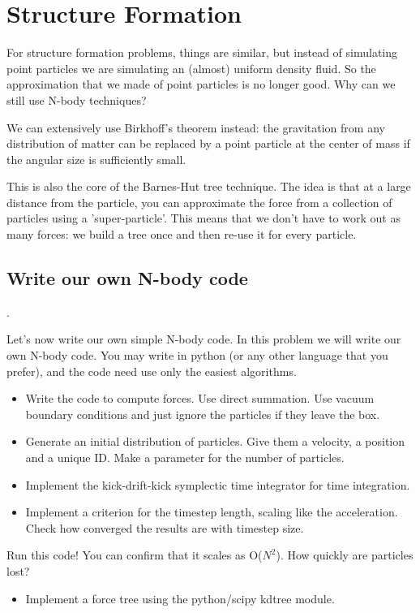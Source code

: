 \documentclass[12pt]{article}
\begin{document}
\section{Structure Formation}

For structure formation problems, things are similar, but instead of simulating point particles we are simulating an (almost) uniform density fluid. So the approximation that we made of point particles is no longer good. Why can we still use N-body techniques?

We can extensively use Birkhoff's theorem instead: the gravitation from any distribution of matter can be replaced by a point particle at the center of mass if the angular size is sufficiently small.

This is also the core of the Barnes-Hut tree technique. The idea is that at a large distance from the particle, you can approximate the force from a collection of particles using a 'super-particle'. This means that we don't have to work out as many forces: we build a tree once and then re-use it for every particle.

\subsection{Write our own N-body code}.

Let's now write our own simple N-body code.
In this problem we will write our own N-body code. You may write in python (or any other language that you prefer), and the code need use only the easiest algorithms.

\begin{itemize}
 \item Write the code to compute forces. Use direct summation. Use vacuum boundary conditions and just ignore the particles if they leave the box.
 \item Generate an initial distribution of particles. Give them a velocity, a position and a unique ID. Make a parameter for the number of particles.
 \item Implement the kick-drift-kick symplectic time integrator for time integration.
 \item Implement a criterion for the timestep length, scaling like the acceleration. Check how converged the results are with timestep size.
\end{itemize}

Run this code! You can confirm that it scales as O($N^2$). How quickly are particles lost?

\begin{itemize}
\item Implement a force tree using the python/scipy kdtree module.
\end{itemize}
\end{document}
